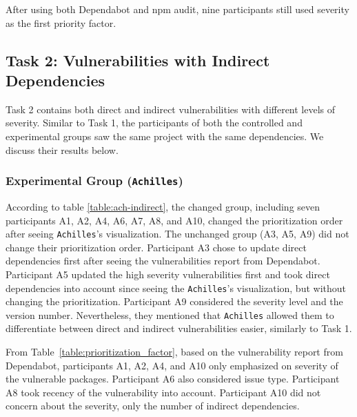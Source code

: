 \documentclass[conference]{IEEEtran}
\begin{document}
	After using both Dependabot and npm audit, nine participants still used severity as the first priority factor.
	
	\subsection{Task 2: Vulnerabilities with Indirect Dependencies}
	Task 2 contains both direct and indirect vulnerabilities with different levels of severity. Similar to Task 1, the participants of both the controlled and experimental groups saw the same project with the same dependencies. We discuss their results below.
	
	\subsubsection{Experimental Group (\texttt{Achilles})}
	According to table \ref{table:ach-indirect},
	the changed group, including seven participants A1, A2, A4, A6, A7, A8, and A10, changed the prioritization order after seeing \texttt{Achilles}'s visualization.  	
	The unchanged group (A3, A5, A9) did not change their prioritization order. Participant A3 chose to update direct dependencies first after seeing the vulnerabilities report from Dependabot. Participant A5 updated the high severity vulnerabilities first and took direct dependencies into account since seeing the \texttt{Achilles}'s visualization, but without changing the prioritization. Participant A9 considered the severity level and the version number. Nevertheless, they mentioned that \texttt{Achilles} allowed them to differentiate between direct and indirect vulnerabilities easier, similarly to Task 1.
	
	From Table~\ref{table:prioritization_factor}, based on the vulnerability report from Dependabot, participants A1, A2, A4, and A10 only emphasized on severity of the vulnerable packages. Participant A6 also considered issue type. Participant A8 took recency of the vulnerability into account. Participant A10 did not concern about the severity, only the number of indirect dependencies.
	
\end{document}
